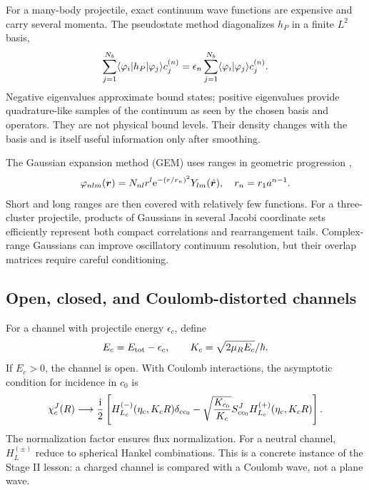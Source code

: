For a many-body projectile, exact continuum wave functions are expensive and
carry several momenta.  The pseudostate method diagonalizes $h_P$ in a finite
$L^2$ basis,
\begin{equation}
  \sum_{j=1}^{N_b}
  \langle \varphi_i \rvert h_P\lvert \varphi_j \rangle c_j^{(n)}
  =\epsilon_n
  \sum_{j=1}^{N_b}\langle \varphi_i|\varphi_j \rangle c_j^{(n)}.
  \label{eq:pseudostate-generalized-eigenproblem}
\end{equation}
Negative eigenvalues approximate bound states; positive eigenvalues provide
quadrature-like samples of the continuum as seen by the chosen basis and
operators.  They are not physical bound levels.  Their density changes with
the basis and is itself useful information only after smoothing.

The Gaussian expansion method (GEM) uses ranges in geometric progression
\cite{Hiyama:2003cu},
\begin{equation}
  \varphi_{nlm}(\bm r)
  =N_{nl}r^l\mathrm{e}^{-(r/r_n)^2}Y_{lm}(\hat{\bm r}),
  \quad
  r_n=r_1a^{n-1}.
  \label{eq:gem-basis}
\end{equation}
Short and long ranges are then covered with relatively few functions.  For a
three-cluster projectile, products of Gaussians in several Jacobi coordinate
sets efficiently represent both compact correlations and rearrangement tails.
Complex-range Gaussians can improve oscillatory continuum resolution, but
their overlap matrices require careful conditioning.

\subsection{Open, closed, and Coulomb-distorted channels}
\label{subsec:cdcc-boundary-conditions}

For a channel with projectile energy $\epsilon_c$, define
\begin{equation}
  E_c=E_{\mathrm{tot}}-\epsilon_c,
  \qquad
  K_c=\sqrt{2\mu_RE_c}/\hbar.
  \label{eq:cdcc-channel-momentum}
\end{equation}
If $E_c>0$, the channel is open.  With Coulomb interactions, the asymptotic
condition for incidence in $c_0$ is
\begin{equation}
  \chi_c^J(R)\longrightarrow
  \frac{\mathrm{i}}{2}\left[
  H_{L_c}^{(-)}(\eta_c,K_cR)\delta_{cc_0}
  -\sqrt{\frac{K_{c_0}}{K_c}}
   S^J_{cc_0}H_{L_c}^{(+)}(\eta_c,K_cR)
  \right].
  \label{eq:cdcc-open-boundary}
\end{equation}
The normalization factor ensures flux normalization.  For a neutral channel,
$H_L^{(\pm)}$ reduce to spherical Hankel combinations.  This is a concrete
instance of the Stage II lesson: a charged channel is compared with a Coulomb
wave, not a plane wave.

